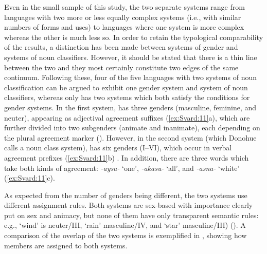 \documentclass[output=collectionpaper]{langsci/langscibook}
\begin{document}
Even in the small sample of this study, the two separate systems range from languages with two more or less equally complex systems (i.e., with similar numbers of forms and uses) to languages where one system is more complex whereas the other is much less so. In order to retain the typological comparability of the results, a distinction has been made between systems of gender and systems of noun classifiers. However, it should be stated that there is a thin line between the two and they most certainly constitute two edges of the same continuum. Following these, four of the five languages with two systems of noun classification can be argued to exhibit one gender system and system of noun classifiers, whereas only  has two systems which both satisfy the conditions for gender systems. In the first system,  has three genders (masculine, feminine, and neuter), appearing as adjectival agreement suffixes (\ref{ex:Svard:11}a), which are further divided into two subgenders (animate and inanimate), each depending on the plural agreement marker (\citealt[105--106]{Donohue2001}). However, in the second system (which Donohue calls a noun class system),  has six genders (I--VI), which occur in verbal agreement prefixes (\ref{ex:Svard:11}b) \citep[101]{Donohue2001}. In addition, there are three words which take both kinds of agreement: \textit{{}-aysa-} `one', \textit{{}-akasu-} `all', and \textit{{}-asna-} `white' (\ref{ex:Svard:11}c).

%


As expected from the number of genders being different, the two systems use different assignment rules. Both systems are sex-based with importance clearly put on sex and animacy, but none of them have only transparent semantic rules: e.g., `wind' is neuter/III, `rain' masculine/IV, and `star' masculine/III) (\citealt[103--107]{Donohue2001}). A comparison of the overlap of the two systems is exemplified in , showing how members are assigned to both systems.
\end{document}
